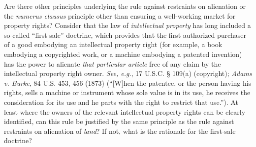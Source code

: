 \item Are there other principles underlying the rule against restraints on
alienation or the \textit{numerus clausus} principle other than ensuring a
well-working market for property rights? Consider that the law of
\textit{intellectual property} has long included a so-called ``first
sale'' doctrine, which provides that the first authorized purchaser of a good
embodying an intellectual property right (for example, a book embodying a
copyrighted work, or a machine embodying a patented invention) has the power to
alienate \textit{that particular article} free of any claim by the
intellectual property right owner. \textit{See, e.g.}, 17 U.S.C. {\S} 109(a)
(copyright); \emph{Adams v. Burke}, 84 U.S. 453, 456 (1873) (``[W]hen the
patentee, or
the person having his rights, sells a machine or instrument whose sole value is
in its use, he receives the consideration for its use and he parts with the
right to restrict that use.''). At least where the owners of the relevant
intellectual property rights can be clearly identified, can this rule be
justified by the same principle as the rule against restraints on alienation of
\textit{land}? If not, what is the rationale for the first-sale doctrine?


